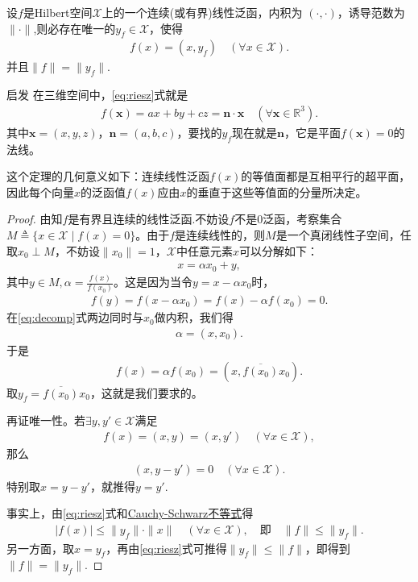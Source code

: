 \documentclass[../../main.tex]{subfiles}%
\begin{document}
\begin{theorem}\label{theorem:Riesz表示定理(Hilbert空间)}
设$f$是Hilbert空间$\mathscr{X}$上的一个连续(或有界)线性泛函，内积为 $(\cdot,\cdot)$，诱导范数为 $\|\cdot\|$,则必存在唯一的$y_f\in\mathscr{X}$，使得
\begin{align}
f(x)=(x,y_f)\quad (\forall x\in\mathscr{X}).
\label{eq:riesz}
\end{align}
并且$\|f\|=\|y_f\|$.
\end{theorem}
\begin{remark}
启发 在三维空间中，\eqref{eq:riesz}式就是
\begin{align*}
f(\bm{x}) = ax + by + cz = \bm{n}\cdot\bm{x} \quad (\forall \bm{x}\in\mathbb{R}^3).
\end{align*}
其中$\bm{x}=(x,y,z)$，$\bm{n}=(a,b,c)$，要找的$y_f$现在就是$\bm{n}$，它是平面$f(\bm{x})=0$的法线。
\end{remark}
\begin{remark}
这个定理的几何意义如下：连续线性泛函$f(x)$的等值面都是互相平行的超平面，因此每个向量$x$的泛函值$f(x)$应由$x$的垂直于这些等值面的分量所决定。
\end{remark}
\begin{proof}

由知$f$是有界且连续的线性泛函.不妨设$f$不是0泛函，考察集合$M\triangleq\{x\in\mathscr{X}\mid f(x)=0\}$。由于$f$是连续线性的，则$M$是一个真闭线性子空间，任取$x_0\perp M$，不妨设$\|x_0\|=1$，$\mathscr{X}$中任意元素$x$可以分解如下：
\begin{align}
x=\alpha x_0 + y,
\label{eq:decomp}
\end{align}
其中$y\in M,\alpha=\frac{f(x)}{f(x_0)}$。这是因为当令$y=x-\alpha x_0$时，
\begin{align*}
f(y)=f(x-\alpha x_0)=f(x)-\alpha f(x_0)=0.
\end{align*}
在\eqref{eq:decomp}式两边同时与$x_0$做内积，我们得
\begin{align*}
\alpha=(x,x_0).
\end{align*}
于是
\begin{align*}
f(x)=\alpha f(x_0)=(x,\overline{f(x_0)}x_0).
\end{align*}
取$y_f=\overline{f(x_0)}x_0$，这就是我们要求的。

再证唯一性。若$\exists y,y'\in\mathscr{X}$满足
\begin{align*}
f(x)=(x,y)=(x,y')\quad (\forall x\in\mathscr{X}),
\end{align*}
那么
\begin{align*}
(x,y-y')=0\quad (\forall x\in\mathscr{X}).
\end{align*}
特别取$x=y-y'$，就推得$y=y'$.

事实上，由\eqref{eq:riesz}式和\hyperref[theorem:泛函分析--Cauchy-Schwarz不等式]{Cauchy-Schwarz不等式}得
\begin{align*}
|f(x)|\leqslant\|y_f\|\cdot\|x\|\quad (\forall x\in\mathscr{X}),\quad \text{即}\quad \|f\|\leqslant\|y_f\|.
\end{align*}
另一方面，取$x=y_f$，再由\eqref{eq:riesz}式可推得$\|y_f\|\leqslant\|f\|$，即得到$\|f\|=\|y_f\|$.
\end{proof}
\end{document}
